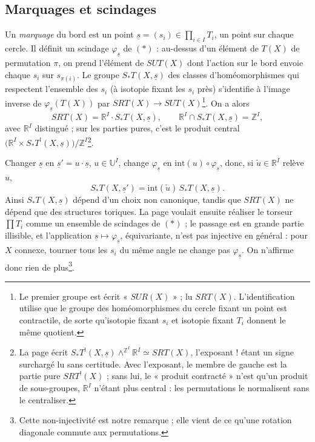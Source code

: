 \documentclass[11pt,a4paper]{article}
\begin{document}
\subsection*{Marquages et scindages}

Un \emph{marquage} du bord est un point $\underline{s} = (s_i) \in \prod_{i \in
I} T_i$, un point sur chaque cercle. Il définit un scindage
$\varphi_{\underline{s}}$ de $(*)$ : au-dessus d'un élément de $T(X)$ de
permutation $\pi$, on prend l'élément de $SUT(X)$ dont l'action sur le bord
envoie chaque $s_i$ sur $s_{\pi(i)}$. Le groupe $S_{*}T(X, \underline{s})$ des
classes d'homéomorphismes qui respectent l'ensemble des $s_i$ (à isotopie
fixant les $s_i$ près) s'identifie à l'image inverse de
$\varphi_{\underline{s}}(T(X))$ par $SRT(X) \to SUT(X)$\footnote{Le premier
groupe est écrit « $SUR(X)$ » ; lu $SRT(X)$. L'identification utilise que le
groupe des homéomorphismes du cercle fixant un point est contractile, de sorte
qu'isotopie fixant $s_i$ et isotopie fixant $T_i$ donnent le même quotient.}.
On a alors
\[
SRT(X) = \mathbb{R}^{I} \cdot S_{*}T(X, \underline{s}), \qquad
\mathbb{R}^{I} \cap S_{*}T(X, \underline{s}) = \mathbb{Z}^{I},
\]
avec $\mathbb{R}^{I}$ distingué ; sur les parties pures, c'est le produit
central $\bigl(\mathbb{R}^{I} \times S_{*}T^{!}(X, \underline{s})\bigr)/
\mathbb{Z}^{I}$\footnote{La page écrit $S_{*}T^{!}(X, \underline{s})
\wedge^{\mathbb{Z}^{I}} \mathbb{R}^{I} \simeq SRT(X)$, l'exposant $!$ étant un
signe surchargé lu sans certitude. Avec l'exposant, le membre de gauche est la
partie pure $SRT^{!}(X)$ ; sans lui, le « produit contracté » n'est qu'un produit
de sous-groupes, $\mathbb{R}^{I}$ n'étant plus central : les permutations le
normalisent sans le centraliser.}.

Changer $\underline{s}$ en $\underline{s}' = u \cdot \underline{s}$, $u \in
\mathbb{U}^{I}$, change $\varphi_{\underline{s}}$ en $\mathrm{int}(u) \circ
\varphi_{\underline{s}}$, donc, si $\tilde u \in \mathbb{R}^{I}$ relève $u$,
\[
S_{*}T(X, \underline{s}') = \mathrm{int}(\tilde u)\, S_{*}T(X, \underline{s}).
\]
Ainsi $S_{*}T(X, \underline{s})$ dépend d'un choix non canonique, tandis que
$SRT(X)$ ne dépend que des structures toriques. La page voulait ensuite
réaliser le torseur $\prod T_i$ comme un ensemble de scindages de $(*)$ ; le
passage est en grande partie illisible, et l'application $\underline{s} \mapsto
\varphi_{\underline{s}}$, équivariante, n'est pas injective en général : pour $X$
connexe, tourner tous les $s_i$ du même angle ne change pas
$\varphi_{\underline{s}}$. On n'affirme donc rien de plus\footnote{Cette
non-injectivité est notre remarque ; elle vient de ce qu'une rotation diagonale
commute aux permutations.}.
\end{document}
